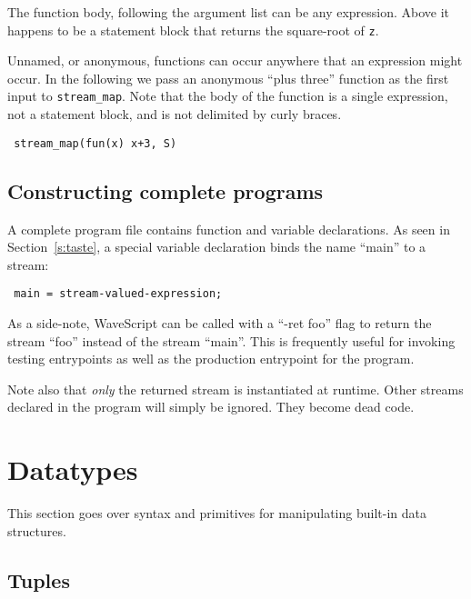\documentclass[twocolumn]{report}
\newcommand{\ws}{WaveScript}
\newenvironment{wscode}{\begin{center}\tt}{\end{center}}
\begin{document}
The function body, following the argument list can be any expression.
Above it happens to be a statement block that returns the
square-root of {\tt z}.

Unnamed, or anonymous, functions can occur anywhere that an expression
might occur. In the following we pass an anonymous ``plus three''
function as the first input to {\tt stream\_map}.  Note that the body
of the function is a single expression, not a statement block, and is
not delimited by curly braces.

\begin{wscode}
stream\_map(fun(x) x+3, S)
\end{wscode}

\subsection{Constructing complete programs}

A complete program file contains function and variable declarations.
As seen in Section~\ref{s:taste}, a special variable declaration
binds the name ``main'' to a stream:
\begin{wscode}
main = stream-valued-expression;
\end{wscode}
As a side-note, {\ws} can be called with a ``-ret foo'' flag to return
the stream ``foo'' instead of the stream ``main''.  This is frequently
useful for invoking testing entrypoints as well as the production
entrypoint for the program.  

Note also that {\em only} the returned stream is instantiated at runtime.
Other streams declared in the program will simply be ignored.  They
become dead code.


\section{Datatypes}

This section goes over syntax and primitives for manipulating
built-in data structures.

\subsection{Tuples}
\end{document}
